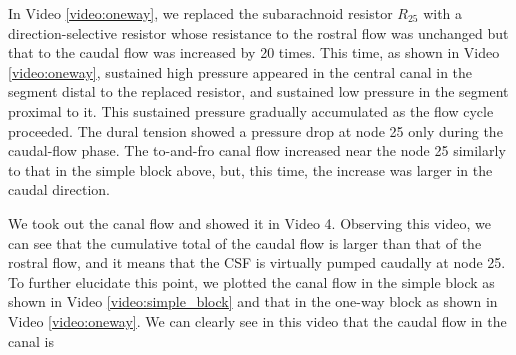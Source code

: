 \documentclass[fleqn,10pt]{wlscirep}
\begin{document}
%

%

In Video \ref{video:oneway}, we replaced the subarachnoid resistor $R_{25}$
with a direction-selective resistor whose resistance to the rostral flow
was unchanged but that to the caudal flow was increased by 20 times. This
time, as shown in Video \ref{video:oneway}, sustained high pressure
appeared in the central canal in the segment distal to the replaced
resistor, and sustained low pressure in the segment proximal to it. This
sustained pressure gradually accumulated as the flow cycle proceeded. The
dural tension showed a pressure drop at node 25 only during the caudal-flow
phase. The to-and-fro canal flow increased near the node 25 similarly to
that in the simple block above, but, this time, the increase was larger in
the caudal direction.

We took out the canal flow and showed it in Video 4. Observing this video,
we can see that the cumulative total of the caudal flow is larger than that
of the rostral flow, and it means that the CSF is virtually pumped caudally
at node 25. To further elucidate this point, we plotted the canal flow in
the simple block as shown in Video \ref{video:simple_block} and that in the
one-way block as shown in Video \ref{video:oneway}. We can clearly see in
this video that the caudal flow in the canal is 
\end{document}
